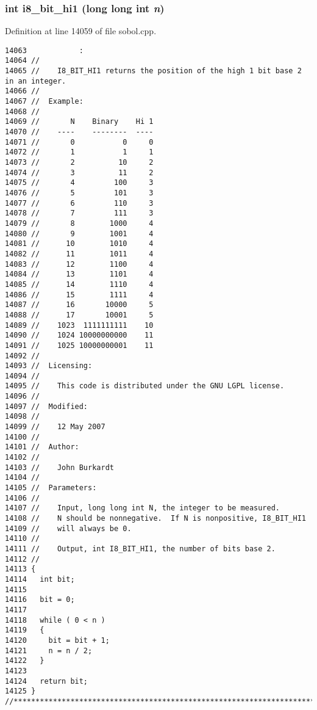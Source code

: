 \subsubsection{\setlength{\rightskip}{0pt plus 5cm}int i8\_\-bit\_\-hi1 (long long int {\em n})}\label{test_2sobol_8H_0408258878e3de2ac2afd7943cf56c7c}




Definition at line 14059 of file sobol.cpp.

\begin{Code}\begin{verbatim}14063            :
14064 //
14065 //    I8_BIT_HI1 returns the position of the high 1 bit base 2 in an integer.
14066 //
14067 //  Example:
14068 //
14069 //       N    Binary    Hi 1
14070 //    ----    --------  ----
14071 //       0           0     0
14072 //       1           1     1
14073 //       2          10     2
14074 //       3          11     2 
14075 //       4         100     3
14076 //       5         101     3
14077 //       6         110     3
14078 //       7         111     3
14079 //       8        1000     4
14080 //       9        1001     4
14081 //      10        1010     4
14082 //      11        1011     4
14083 //      12        1100     4
14084 //      13        1101     4
14085 //      14        1110     4
14086 //      15        1111     4
14087 //      16       10000     5
14088 //      17       10001     5
14089 //    1023  1111111111    10
14090 //    1024 10000000000    11
14091 //    1025 10000000001    11
14092 //
14093 //  Licensing:
14094 //
14095 //    This code is distributed under the GNU LGPL license. 
14096 //
14097 //  Modified:
14098 //
14099 //    12 May 2007
14100 //
14101 //  Author:
14102 //
14103 //    John Burkardt
14104 //
14105 //  Parameters:
14106 //
14107 //    Input, long long int N, the integer to be measured.
14108 //    N should be nonnegative.  If N is nonpositive, I8_BIT_HI1
14109 //    will always be 0.
14110 //
14111 //    Output, int I8_BIT_HI1, the number of bits base 2.
14112 //
14113 {
14114   int bit;
14115 
14116   bit = 0;
14117 
14118   while ( 0 < n )
14119   {
14120     bit = bit + 1;
14121     n = n / 2;
14122   }
14123 
14124   return bit;
14125 }
//****************************************************************************80
\end{verbatim}
\end{Code}



